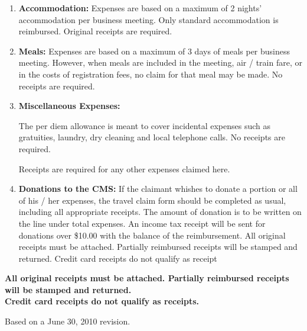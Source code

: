 \documentclass[10pt]{report}
\begin{document}
\begin{enumerate}
{\bf Full reimbursement:} As this copy is required for the return
trip, those requesting and expecting full reimbursement of their
travel fees should submit their claim upon completion of the trip.

\item {\bf Accommodation:} 
  Expenses are based on a maximum of 2 nights' accommodation per
  business meeting. Only standard accommodation is
  reimbursed. Original receipts are required.

\item {\bf Meals:} Expenses are based on a maximum of 3 days of meals
  per business meeting. However, when meals are included in the
  meeting, air / train fare, or in the costs of registration fees, no
  claim for that meal may be made. No receipts are required.

\item {\bf Miscellaneous Expenses:} 

  The per diem allowance is meant to cover incidental expenses such as
  gratuities, laundry, dry cleaning and local telephone calls. No
  receipts are required.

  Receipts are required for any other expenses claimed here.

\item {\bf Donations to the CMS:}
  If the claimant whishes to donate a portion or all of his / her
  expenses, the travel claim form should be completed as usual,
  including all appropriate receipts. The amount of donation is to be
  written on the line under total expenses. An income tax receipt will
  be sent for donations over \$10.00 with the balance of the
  reimbursement.  All original receipts must be attached. Partially
  reimbursed receipts will be stamped and returned.  Credit card
  receipts do not qualify as receipt

\end{enumerate}
\begin{center}
  {\bf All original receipts must be attached. Partially reimbursed
    receipts will be stamped and returned.  \\Credit card receipts do
    not qualify as receipts.}
\end{center}
{\footnotesize Based on a June 30, 2010 revision.}
\end{document}
